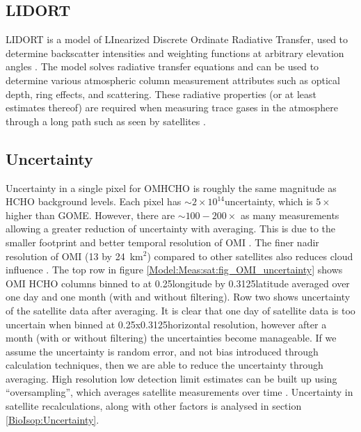   \subsection{LIDORT}
    \label{Model:Meas:sat:LIDORT}
    
    LIDORT is a model of LInearized Discrete Ordinate Radiative Transfer, used to determine backscatter intensities and weighting functions at arbitrary elevation angles \parencite{Spurr2001}.
    The model solves radiative transfer equations and can be used to determine various atmospheric column measurement attributes such as optical depth, ring effects, and scattering.
    These radiative properties (or at least estimates thereof) are required when measuring trace gases in the atmosphere through a long path such as seen by satellites \parencite[eg.][]{Palmer2001,Martin2002a,DeSmedt2015,Abad2015}.
  
  \subsection{Uncertainty}
    Uncertainty in a single pixel for OMHCHO is roughly the same magnitude as HCHO background levels.
    Each pixel has $\sim 2 \times 10^{14}$\moleccm uncertainty, which is $5 \times$ higher than GOME.
    However, there are $\sim 100-200 \times $ as many measurements allowing a greater reduction of uncertainty with averaging.
    This is due to the smaller footprint and better temporal resolution of OMI \parencite{Chance2002,Millet2008}.
    The finer nadir resolution of OMI (13 by 24~km${^2}$) compared to other satellites also reduces cloud influence \parencite{Millet2006, Millet2008}.
    The top row in figure \ref{Model:Meas:sat:fig_OMI_uncertainty} shows OMI HCHO columns binned to at 0.25\degr longitude by 0.3125\degr latitude averaged over one day and one month (with and without filtering).
    Row two shows uncertainty of the satellite data after averaging.
    It is clear that one day of satellite data is too uncertain when binned at 0.25x0.3125\degr horizontal resolution, however after a month (with or without filtering) the uncertainties become manageable.
    If we assume the uncertainty is random error, and not bias introduced through calculation techniques, then we are able to reduce the uncertainty through averaging.
    High resolution low detection limit estimates can be built up using ``oversampling'', which averages satellite measurements over time \parencite[eg.][]{Zhu2014}.
    Uncertainty in satellite recalculations, along with other factors is analysed in section \ref{BioIsop:Uncertainty}.
    
